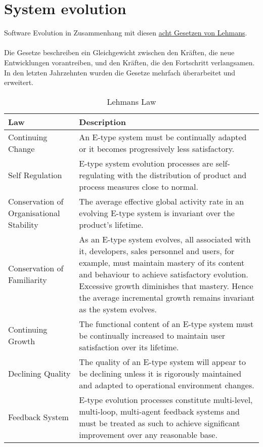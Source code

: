 \chapter{System evolution}

Software Evolution in Zusammenhang mit diesen \href{https://en.wikipedia.org/wiki/Lehman%27s_laws_of_software_evolution}{acht Gesetzen von Lehmans}. \\ \\

Die Gesetze beschreiben ein Gleichgewicht zwischen den Kr\"{a}ften, die neue Entwicklungen vorantreiben, und den Kr\"{a}ften, die den Fortschritt verlangsamen. In den letzten Jahrzehnten wurden die Gesetze mehrfach \"{u}berarbeitet und erweitert.

\begin{table}[H]
 \caption{Lehmans Law}
 \begin{tabularx}{\textwidth}{|l|X|}
     \hline
     \textbf{Law}                               & \textbf{Description} \\
     \hline
     Continuing Change                          & An E-type system must be continually adapted or it becomes progressively less satisfactory. \\
     \hline
     Self Regulation                            & E-type system evolution processes are self-regulating with the distribution of product and process measures close to normal. \\
     \hline
     Conservation of Organisational Stability   & The average effective global activity rate in an evolving E-type system is invariant over the product's lifetime. \\
     \hline
     Conservation of Familiarity                & As an E-type system evolves, all associated with it, developers, sales personnel and users, for example, must maintain mastery of its content and behaviour to achieve satisfactory evolution. Excessive growth diminishes that mastery. Hence the average incremental growth remains invariant as the system evolves. \\
     \hline
     Continuing Growth                          & The functional content of an E-type system must be continually increased to maintain user satisfaction over its lifetime. \\
     \hline
     Declining Quality                          & The quality of an E-type system will appear to be declining unless it is rigorously maintained and adapted to operational environment changes. \\
     \hline
     Feedback System                            & E-type evolution processes constitute multi-level, multi-loop, multi-agent feedback systems and must be treated as such to achieve significant improvement over any reasonable base. \\
     \hline
 \end{tabularx}
 \label{table: Lehmans Law}
\end{table}

